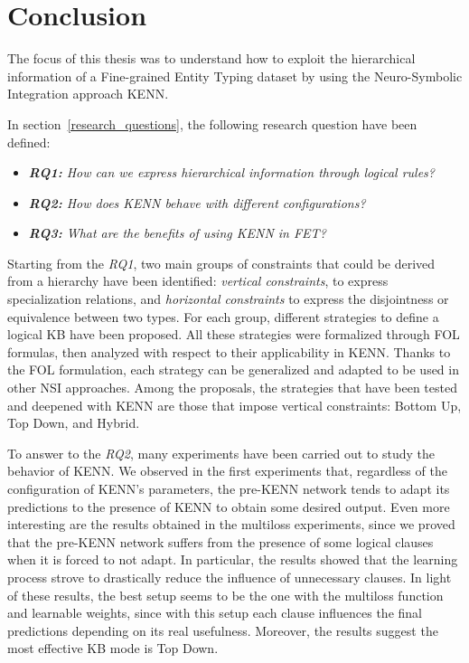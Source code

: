 \section{Conclusion} \label{conclusion}
The focus of this thesis was to understand how to exploit the hierarchical information of a Fine-grained Entity Typing dataset by using the Neuro-Symbolic Integration approach KENN. 

In section~\ref{research_questions}, the following research question have been defined:
\begin{itemize}
    \item \textit{\textbf{RQ1: }How can we express hierarchical information through logical rules?}
    \item \textit{\textbf{RQ2: }How does KENN behave with different configurations?}
    \item \textit{\textbf{RQ3: }What are the benefits of using KENN in FET?}
\end{itemize}

Starting from the \textit{RQ1}, two main groups of constraints that could be derived from a hierarchy have been identified: \textit{vertical constraints}, to express specialization relations, and \textit{horizontal constraints} to express the disjointness or equivalence between two types. For each group, different strategies to define a logical KB have been proposed. All these strategies were formalized through FOL formulas, then analyzed with respect to their applicability in KENN. Thanks to the FOL formulation, each strategy can be generalized and adapted to be used in other NSI approaches. Among the proposals, the strategies that have been tested and deepened with KENN are those that impose vertical constraints: Bottom Up, Top Down, and Hybrid.

To answer to the \textit{RQ2}, many experiments have been carried out to study the behavior of KENN. We observed in the first experiments that, regardless of the configuration of KENN's parameters, the pre-KENN network tends to adapt its predictions to the presence of KENN to obtain some desired output. Even more interesting are the results obtained in the multiloss experiments, since we proved that the pre-KENN network suffers from the presence of some logical clauses when it is forced to not adapt. In particular, the results showed that the learning process strove to drastically reduce the influence of unnecessary clauses. In light of these results, the best setup seems to be the one with the multiloss function and learnable weights, since with this setup each clause influences the final predictions depending on its real usefulness. Moreover, the results suggest the most effective KB mode is Top Down.

